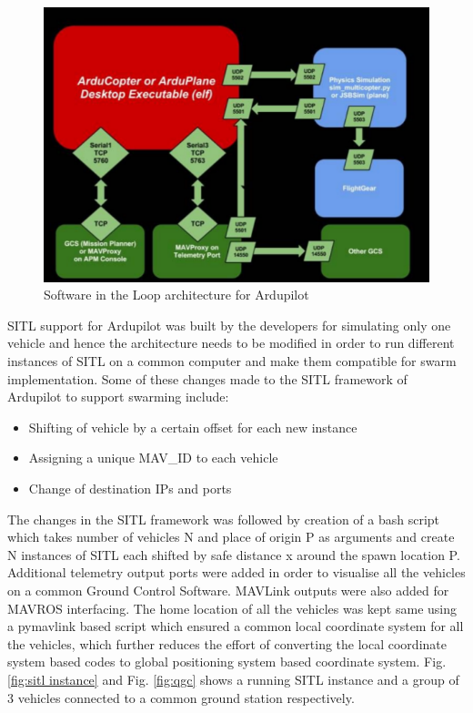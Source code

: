\begin{spacing}{2}
\begin{figure}
    \centering
    \includegraphics[width=0.8\linewidth]{image/SITLarch.png}
    \caption{Software in the Loop architecture for Ardupilot}
    \label{fig:sitlarch}
\end{figure}

SITL support for Ardupilot was built by the developers for simulating only one
vehicle and hence the architecture needs to be modified in order to run different
instances of SITL on a common computer and make them compatible for swarm
implementation. Some of these changes made to the SITL framework of Ardupilot to
support swarming include:
\begin{itemize}
    \item Shifting of vehicle by a certain offset for each new instance
    \item Assigning a unique MAV\_ID to each vehicle
    \item Change of destination IPs and ports
\end{itemize}
The changes in the SITL framework was followed by creation of a bash script
which takes number of vehicles N and place of origin P as arguments and create N
instances of SITL each shifted by safe distance x around the spawn location P.
Additional telemetry output ports were added in order to visualise all the vehicles
on a common Ground Control Software. MAVLink outputs were also added for MAVROS interfacing. The home location of all the vehicles was kept same using a
pymavlink based script which ensured a common local coordinate system for all the
vehicles, which further reduces the effort of converting the local coordinate system
based codes to global positioning system based coordinate system.
Fig. \ref{fig:sitl instance} and Fig. \ref{fig:qgc} shows a running SITL instance and a group of 3 vehicles connected to a common ground station respectively.


\end{spacing}
